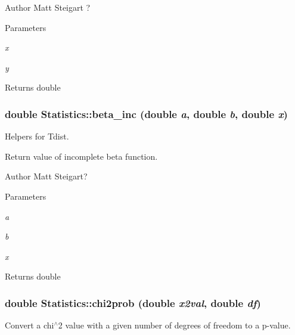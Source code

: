 \begin{DoxyAuthor}{Author}
Matt Steigart ?
\end{DoxyAuthor}

\begin{DoxyParams}{Parameters}
\item[{\em x}]\item[{\em y}]\end{DoxyParams}
\begin{DoxyReturn}{Returns}
double 
\end{DoxyReturn}
\hypertarget{classStatistics_a5ba99c9fa2e04ab87c0bb9fb82b36971}{
\subsubsection[{beta\_\-inc}]{\setlength{\rightskip}{0pt plus 5cm}double Statistics::beta\_\-inc (double {\em a}, \/  double {\em b}, \/  double {\em x})}}
\label{classStatistics_a5ba99c9fa2e04ab87c0bb9fb82b36971}


Helpers for Tdist. 

Return value of incomplete beta function.

\begin{DoxyAuthor}{Author}
Matt Steigart?
\end{DoxyAuthor}

\begin{DoxyParams}{Parameters}
\item[{\em a}]\item[{\em b}]\item[{\em x}]\end{DoxyParams}
\begin{DoxyReturn}{Returns}
double 
\end{DoxyReturn}
\hypertarget{classStatistics_a7577018477349241f3c5ae3760590aee}{
\subsubsection[{chi2prob}]{\setlength{\rightskip}{0pt plus 5cm}double Statistics::chi2prob (double {\em x2val}, \/  double {\em df})}}
\label{classStatistics_a7577018477349241f3c5ae3760590aee}
Convert a chi$^\wedge$2 value with a given number of degrees of freedom to a p-\/value.

